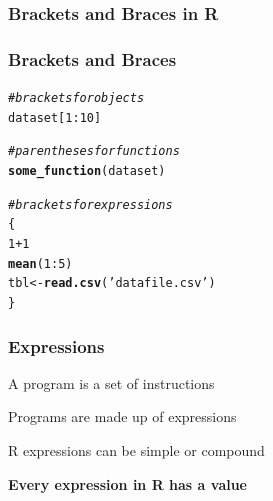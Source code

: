 \documentclass[12pt]{beamer}\usepackage[]{graphicx}\usepackage[]{color}
\makeatletter
\newcommand{\hlnum}[1]{\textcolor[rgb]{0.686,0.059,0.569}{#1}}%
\newcommand{\hlstr}[1]{\textcolor[rgb]{0.192,0.494,0.8}{#1}}%
\newcommand{\hlcom}[1]{\textcolor[rgb]{0.678,0.584,0.686}{\textit{#1}}}%
\newcommand{\hlopt}[1]{\textcolor[rgb]{0,0,0}{#1}}%
\newcommand{\hlstd}[1]{\textcolor[rgb]{0.345,0.345,0.345}{#1}}%
\newcommand{\hlkwb}[1]{\textcolor[rgb]{0.69,0.353,0.396}{#1}}%
\newcommand{\hlkwd}[1]{\textcolor[rgb]{0.737,0.353,0.396}{\textbf{#1}}}%
\newenvironment{kframe}{%
 \def\at@end@of@kframe{}%
 \ifinner\ifhmode%
  \def\at@end@of@kframe{\end{minipage}}%
  \begin{minipage}{\columnwidth}%
 \fi\fi%
 \def\FrameCommand##1{\hskip\@totalleftmargin \hskip-\fboxsep
 \colorbox{shadecolor}{##1}\hskip-\fboxsep
     \hskip-\linewidth \hskip-\@totalleftmargin \hskip\columnwidth}%
 \MakeFramed {\advance\hsize-\width
   \@totalleftmargin\z@ \linewidth\hsize
   \@setminipage}}%
 {\par\unskip\endMakeFramed%
 \at@end@of@kframe}
\newenvironment{knitrout}{}{} %
\makeatother
\begin{document}

\begin{frame}[fragile]
\frametitle{Brackets and Braces in R}
\begin{center}
\end{center}
\end{frame}


\begin{frame}[fragile]
\frametitle{Brackets and Braces}
\begin{knitrout}\footnotesize
{}\color{fgcolor}\begin{kframe}
\begin{alltt}
\hlcom{# brackets for objects}
\hlstd{dataset[}\hlnum{1}\hlopt{:}\hlnum{10}\hlstd{]}
\end{alltt}
\end{kframe}
\end{knitrout}

\pause
\begin{knitrout}\footnotesize
{}\color{fgcolor}\begin{kframe}
\begin{alltt}
\hlcom{# parentheses for functions}
\hlkwd{some_function}\hlstd{(dataset)}
\end{alltt}
\end{kframe}
\end{knitrout}

\pause
\begin{knitrout}\footnotesize
{}\color{fgcolor}\begin{kframe}
\begin{alltt}
\hlcom{# brackets for expressions}
\hlstd{\{}
  \hlnum{1} \hlopt{+} \hlnum{1}
  \hlkwd{mean}\hlstd{(}\hlnum{1}\hlopt{:}\hlnum{5}\hlstd{)}
  \hlstd{tbl} \hlkwb{<-} \hlkwd{read.csv}\hlstd{(}\hlstr{'datafile.csv'}\hlstd{)}
\hlstd{\}}
\end{alltt}
\end{kframe}
\end{knitrout}
\end{frame}


\begin{frame}[fragile]
\frametitle{Expressions}

\bbi
  \item A program is a set of instructions
  \item Programs are made up of expressions
  \item R expressions can be simple or compound
  \item \textbf{Every expression in R has a value}
\ei

\end{frame}
\end{document}
